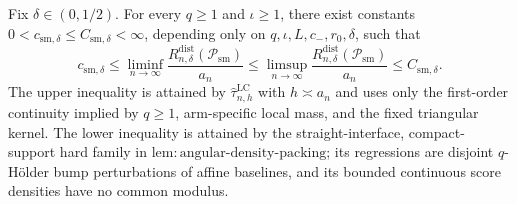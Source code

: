 Fix \(\delta\in(0,1/2)\). For every \(q\geq1\) and \(\iota\geq1\), there exist constants \(0<c_{\mathrm{sm},\delta}\leq C_{\mathrm{sm},\delta}<\infty\), depending only on \(q,\iota,L,c_{-},r_0,\delta\), such that \[c_{\mathrm{sm},\delta}\leq\liminf_{n\to\infty}\frac{R_{n,\delta}^{\mathrm{dist}}(\mathcal{P}_{\mathrm{sm}})}{a_n}\leq\limsup_{n\to\infty}\frac{R_{n,\delta}^{\mathrm{dist}}(\mathcal{P}_{\mathrm{sm}})}{a_n}\leq C_{\mathrm{sm},\delta}.\] The upper inequality is attained by \(\widehat{\tau}^{\mathrm{LC}}_{n,h}\) with \(h\asymp a_n\) and uses only the first-order continuity implied by \(q\geq1\), arm-specific local mass, and the fixed triangular kernel. The lower inequality is attained by the straight-interface, compact-support hard family in \(\mathrm{lem:angular\text{-}density\text{-}packing}\); its regressions are disjoint \(q\)-H\"older bump perturbations of affine baselines, and its bounded continuous score densities have no common modulus.